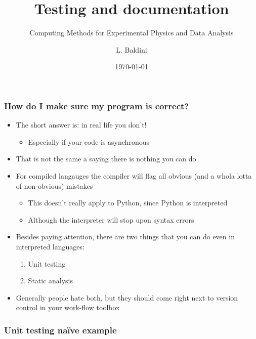 \documentclass[9pt]{beamer}
\title{Testing and documentation}
\subtitle{Computing Methods for Experimental Physics and Data Analysis}
\date{\today}
\author{L. Baldini}
\institute[UNIPI and INFN]{Universit\`a and INFN--Pisa}
\begin{document}
\titleframe



\begin{frame}
  \frametitle{How do I make sure my program is correct?}
  \begin{itemize}
  \item The short answer is: in real life you don't!
    \begin{itemize}
    \item Especially if your code is asynchronous
    \end{itemize}
  \item \alert{That is not the same a saying there is nothing you can do}
  \item For compiled langauges the compiler will flag all obvious (and a whola
    lotta of non-obvious) mistakes
    \begin{itemize}
    \item This doesn't really apply to Python, since Python is interpreted
    \item Although the interpreter will stop upon syntax errors
    \end{itemize}
  \item Besides paying attention, there are two things that you can do even
    in interpreted languages:
    \begin{enumerate}
    \item \alert{Unit testing}
    \item \alert{Static analysis}
    \end{enumerate}
  \item Generally people hate both, but they should come right next to
    version control in your work-flow toolbox
  \end{itemize}
\end{frame}


\begin{frame}
  \frametitle{Unit testing na\"ive example}
  
\end{frame}
\end{document}
